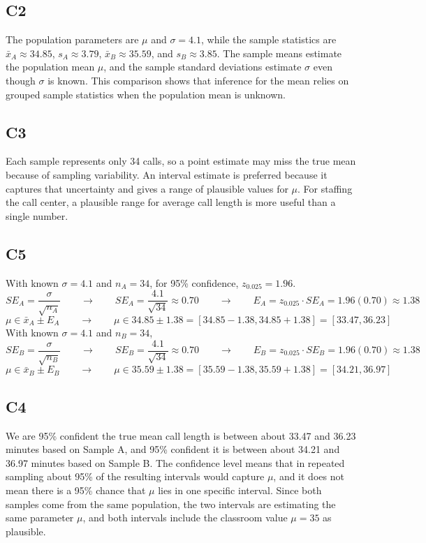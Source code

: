 \begin{ExamProblems}
		\subsection*{C2}
		The population parameters are $\mu$ and $\sigma = 4.1$, while the sample statistics are $\bar{x}_A \approx 34.85$, $s_A \approx 3.79$, $\bar{x}_B \approx 35.59$, and $s_B \approx 3.85$. The sample means estimate the population mean $\mu$, and the sample standard deviations estimate $\sigma$ even though $\sigma$ is known. This comparison shows that inference for the mean relies on grouped sample statistics when the population mean is unknown.

		\subsection*{C3}
		Each sample represents only 34 calls, so a point estimate may miss the true mean because of sampling variability. An interval estimate is preferred because it captures that uncertainty and gives a range of plausible values for $\mu$. For staffing the call center, a plausible range for average call length is more useful than a single number.

		\subsection*{C5}
		With known $\sigma = 4.1$ and $n_A = 34$, for 95\% confidence, $z_{0.025}=1.96$.
		\[
		SE_A = \frac{\sigma}{\sqrt{n_A}}  \qquad \longrightarrow \qquad SE_A = \frac{4.1}{\sqrt{34}} \approx 0.70  \qquad \longrightarrow \qquad  E_A = z_{0.025} \cdot SE_A = 1.96(0.70) \approx 1.38
		\]
		\[
		\mu \in \bar{x}_A \pm E_A  \qquad \longrightarrow \qquad \mu \in 34.85 \pm 1.38 = [34.85 - 1.38, 34.85 + 1.38] = [33.47, 36.23]
		\]
		With known $\sigma = 4.1$ and $n_B = 34$,
		\[
		SE_B = \frac{\sigma}{\sqrt{n_B}}  \qquad \longrightarrow \qquad SE_B = \frac{4.1}{\sqrt{34}} \approx 0.70  \qquad \longrightarrow \qquad  E_B = z_{0.025} \cdot SE_B = 1.96(0.70) \approx 1.38
		\]
		\[
		\mu \in \bar{x}_B \pm E_B   \qquad \longrightarrow \qquad \mu \in 35.59 \pm 1.38 = [35.59 - 1.38, 35.59 + 1.38] = [34.21, 36.97]
		\]

		\subsection*{C4}
		We are 95\% confident the true mean call length is between about 33.47 and 36.23 minutes based on Sample A, and 95\% confident it is between about 34.21 and 36.97 minutes based on Sample B. The confidence level means that in repeated sampling about 95\% of the resulting intervals would capture $\mu$, and it does not mean there is a 95\% chance that $\mu$ lies in one specific interval. Since both samples come from the same population, the two intervals are estimating the same parameter $\mu$, and both intervals include the classroom value $\mu = 35$ as plausible.


\end{ExamProblems}
